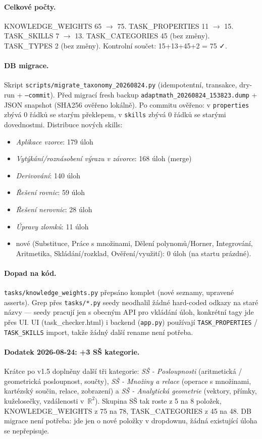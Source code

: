\documentclass[11pt,a4paper]{article}
\begin{document}
\paragraph{Celkové počty.} KNOWLEDGE\_WEIGHTS 65 $\rightarrow$ 75. TASK\_PROPERTIES 11 $\rightarrow$ 15. TASK\_SKILLS 7 $\rightarrow$ 13. TASK\_CATEGORIES 45 (bez změny). TASK\_TYPES 2 (bez změny). Kontrolní součet: 15+13+45+2 = 75 ✓.

\paragraph{DB migrace.} Skript \texttt{scripts/migrate\_taxonomy\_20260824.py} (idempotentní, transakce, dry-run + \texttt{--commit}). Před migrací fresh backup \texttt{adaptmath\_20260824\_153823.dump} + JSON snapshot (SHA256 ověřeno lokálně). Po commitu ověřeno: v \texttt{properties} zbývá 0 řádků se starým překlepem, v \texttt{skills} zbývá 0 řádků se starými dovednostmi. Distribuce nových skills:
\begin{itemize}
  \item \emph{Aplikace vzorce}: 179 úloh
  \item \emph{Vytýkání/roznásobení výrazu v závorce}: 168 úloh (merge)
  \item \emph{Derivování}: 140 úloh
  \item \emph{Řešení rovnic}: 59 úloh
  \item \emph{Řešení nerovnic}: 28 úloh
  \item \emph{Úpravy zlomků}: 11 úloh
  \item nové (Substituce, Práce s množinami, Dělení polynomů/Horner, Integrování, Aritmetika, Skládání/rozklad, Ověření/využití): 0 úloh (na startu prázdné).
\end{itemize}

\paragraph{Dopad na kód.} \texttt{tasks/knowledge\_weights.py} přepsáno komplet (nové seznamy, upravené asserts). Grep přes \texttt{tasks/*.py} seedy neodhalil žádné hard-coded odkazy na staré názvy --- seedy pracují jen s obecným API pro vkládání úloh, konkrétní tagy jde přes UI. UI (task\_checker.html) i backend (\texttt{app.py}) používají \texttt{TASK\_PROPERTIES} / \texttt{TASK\_SKILLS} import, takže žádný další rename není potřeba.

\paragraph{Dodatek 2026-08-24: +3 SŠ kategorie.} Krátce po v1.5 doplněny další tři kategorie: \emph{SŠ - Posloupnosti} (aritmetická / geometrická posloupnost, součty), \emph{SŠ - Množiny a relace} (operace s množinami, kartézský součin, relace, zobrazení) a \emph{SŠ - Analytická geometrie} (vektory, přímky, kuželosečky, vzdálenosti v~$\mathbb{R}^2$). Skupina SŠ tak roste z 5 na 8 položek, KNOWLEDGE\_WEIGHTS z 75 na 78, TASK\_CATEGORIES z 45 na 48. DB migrace není potřeba: jde jen o nové položky v dropdownu, žádná existující úloha se nepřepisuje.
\end{document}
